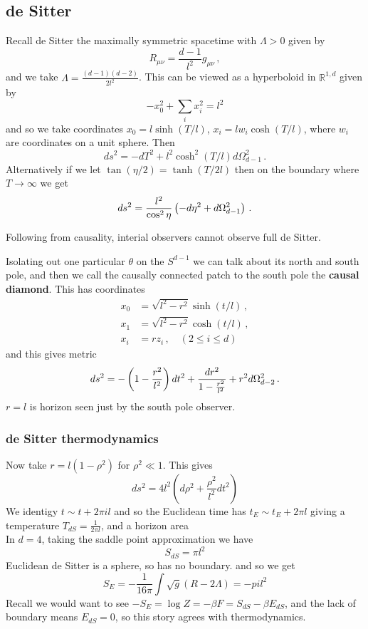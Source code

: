 \documentclass{article}
\begin{document}
\subsection{de Sitter}
Recall de Sitter the maximally symmetric spacetime with $\Lambda>0$ given by 
\[
R_{\mu \nu} = \frac{d-1}{l^2} g_{\mu \nu} \, ,
\]
and we take $\Lambda = \frac{(d-1)(d-2)}{2 l^2}$. This can be viewed as a hyperboloid in $\mathbb{R}^{1,d}$ given by 
\[
-x_0^2 + \sum_i x_i^2 = l^2
\]
and so we take coordinates $x_0 = l \sinh(T/l)$, $x_i = l w_i\cosh(T/l)$, where $w_i$ are coordinates on a unit sphere. Then 
\[
ds^2 = -dT^2 + l^2 \cosh^2(T/l) d \Omega_{d-1}^2 \, .
\]
Alternatively if we let $\tan(\eta/2) = \tanh(T/2l)$ then on the boundary where $T \to \infty$ we get 
\[
ds^2 = \frac{l^2}{\cos^2 \eta} \left( -d\eta^2 + d\Omega_{d-1}^2 \right) \, .
\] 
\begin{remark}
	Following from causality, interial observers cannot observe full de Sitter. 
\end{remark}
Isolating out one particular $\theta$ on the $S^{d-1}$ we can talk about its north and south pole, and then we call the causally connected patch to the south pole the \textbf{causal diamond}. This has coordinates 
\begin{align*}
	x_0 &= \sqrt{l^2 - r^2} \sinh(t/l) \, , \\
	x_1 &= \sqrt{l^2 - r^2} \cosh(t/l) \, , \\
	x_i &= r z_i \, , \quad (2 \leq i \leq d)
\end{align*} 
and this gives metric 
\[
ds^2 = -\left( 1-\frac{r^2}{l^2} \right) dt^2 + \frac{dr^2}{1-\frac{r^2}{l^2}} + r^2 d \Omega_{d-2}^2 \, .
\]
$r=l$ is horizon seen just by the south pole observer. 
\subsubsection{de Sitter thermodynamics}
Now take $r = l(1-\rho^2)$ for $\rho^2 \ll 1$. This gives 
\[
ds^2 = 4l^2 (d \rho^2 + \frac{\rho^2}{l^2} dt^2)
\]
We identigy $t \sim t + 2\pi i l$ and so the Euclidean time has $t_E \sim t_E + 2 \pi l$ giving a temperature $T_{dS} = \frac{1}{2 \pi l}$, and a horizon area \\
In $d=4$, taking the saddle point approximation we have 
\[
S_{dS} = \pi  l^2 
\]
Euclidean de Sitter is a sphere, so has no boundary. and so we get 
\[
S_E = -\frac{1}{16 \pi} \int \sqrt{g}(R - 2\Lambda) = - pi l^2 
\]
Recall we would want to see $-S_E = \log Z = - \beta F = S_{dS} - \beta E_{dS}$, and the lack of boundary means $E_{dS} = 0$, so this story agrees with thermodynamics. 
\end{document}
